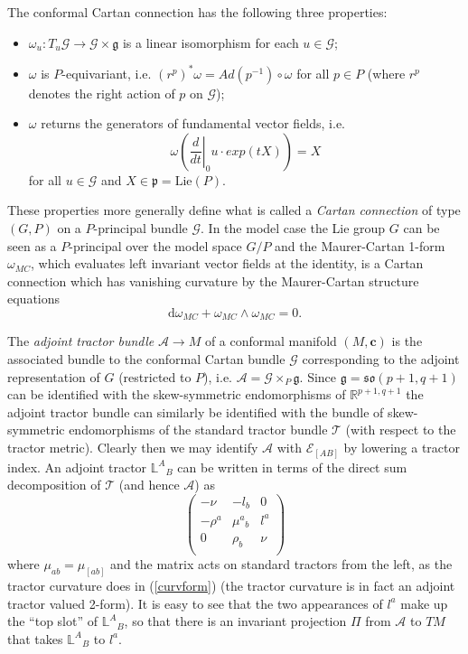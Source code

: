 \documentclass[a4paper,12pt]{amsart}
\newcommand{\cc}{\boldsymbol{c}}
\theoremstyle{remark}
\newcommand{\nn}[1]{(\ref{#1})}
\begin{document}
The conformal Cartan connection has the following three properties:
\begin{itemize}
\item $\omega_u : T_u \mathcal{G} \rightarrow \mathcal{G}\times \mathfrak{g}$ is a linear isomorphism for each $u\in \mathcal{G}$;
\item $\omega$ is $P$-equivariant, i.e. $(r^p)^*\omega = Ad(p^{-1})\circ \omega$ for all $p\in P$ (where $r^p$ denotes the right action of $p$ on $\mathcal{G}$);
\item $\omega$ returns the generators of fundamental vector fields, i.e.
$$
\omega \left(\left.\frac{d}{dt}\right|_0u\cdot exp(tX)\right)=X
$$
for all $u\in \mathcal{G}$ and $X\in \mathfrak{p}=\mathrm{Lie}(P)$.
\end{itemize}
These properties more generally define what is called a \emph{Cartan connection} of type $(G,P)$ on a $P$-principal bundle $\mathcal{G}$. In the model case the Lie group $G$ can be seen as a $P$-principal over the model space $G/P$ and the Maurer-Cartan 1-form $\omega_{MC}$, which evaluates left invariant vector fields at the identity, is a Cartan connection which has vanishing curvature by the Maurer-Cartan structure equations
$$
\mathrm{d}\omega_{MC} + \omega_{MC}\wedge \omega_{MC} =0.
$$

The \emph{adjoint tractor bundle} $\mathcal{A}\rightarrow M$ of a conformal manifold $(M,\cc)$ is the associated bundle to the conformal Cartan bundle $\mathcal{G}$ corresponding to the adjoint representation of $G$ (restricted to $P$), i.e. $\mathcal{A}=\mathcal{G}\times_P \mathfrak{g}$. Since $\mathfrak{g}=\mathfrak{so}(p+1,q+1)$ can be identified with the skew-symmetric endomorphisms of $\mathbb{R}^{p+1,q+1}$ the adjoint tractor bundle can similarly be identified with the bundle of skew-symmetric endomorphisms of the standard tractor bundle $\mathcal{T}$ (with respect to the tractor metric). Clearly then we may identify $\mathcal{A}$ with $\mathcal{E}_{[AB]}$ by lowering a tractor index. An adjoint tractor $\mathbb{L}^A{_B}$ can be written in terms of the direct sum decomposition of $\mathcal{T}$ (and hence $\mathcal{A}$) as 
\begin{equation} \label{AdjTrac}
\left(\begin{array}{ccc} -\nu & -l_b & 0 \\
-\rho^a & \mu^a{_b} & l^a \\ 
0 & \rho_b & \nu \\
\end{array}\right)
\end{equation}
where $\mu_{ab}=\mu_{[ab]}$ and the matrix acts on standard tractors from the left, as the tractor curvature does in \nn{curvform} (the tractor curvature is in fact an adjoint tractor valued 2-form). It is easy to see that the two appearances of $l^a$ make up the ``top slot'' of $\mathbb{L}^A{_B}$, so that there is an invariant projection $\Pi$ from $\mathcal{A}$ to $TM$ that takes $\mathbb{L}^A{_B}$ to $l^a$.
\end{document}
